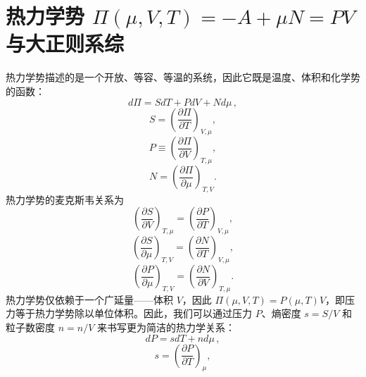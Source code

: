 \section{\texorpdfstring{热力学势 \(\Pi(\mu,V,T)=-A+\mu N=PV\) 与大正则系综}{热力学势 \textbackslash Pi(\textbackslash mu,V,T)=-A+\textbackslash mu N=PV 与大正则系综}}\label{ux70edux529bux5b66ux52bf-pimuvt-amu-npv-ux4e0eux5927ux6b63ux5219ux7cfbux7efc}
热力学势描述的是一个开放、等容、等温的系统，因此它既是温度、体积和化学势的函数：
\begin{equation}\tag{17.11.1}\label{eq:17.11.1}
d \Pi = S d T + P d V + N d \mu \, ,
\end{equation}
\begin{equation}\tag{17.11.2}\label{eq:17.11.2}
S = \left( \frac { \partial \Pi } { \partial T } \right) _ { V , \mu } ,
\end{equation}
\begin{equation}\tag{17.11.3}\label{eq:17.11.3}
P \equiv \left( \frac { \partial \Pi } { \partial V } \right) _ { T , \mu } ,
\end{equation}
\begin{equation}\tag{17.11.4}\label{eq:17.11.4}
N = \left( { \frac { \partial \Pi } { \partial \mu } } \right) _ { T , V } .
\end{equation}
热力学势的麦克斯韦关系为
\begin{equation}\tag{17.11.5}\label{eq:17.11.5}
\left( \frac { \partial S } { \partial V } \right) _ { T , \mu } = \left( \frac { \partial P } { \partial T } \right) _ { V , \mu } ,
\end{equation}
\begin{equation}\tag{17.11.6}\label{eq:17.11.6}
\left( \frac { \partial S } { \partial \mu } \right) _ { T , V } = \left( \frac { \partial N } { \partial T } \right) _ { V , \mu } ,
\end{equation}
\begin{equation}\tag{17.11.7}\label{eq:17.11.7}
\left( \frac { \partial P } { \partial \mu } \right) _ { T , V } = \left( \frac { \partial N } { \partial V } \right) _ { T , \mu } .
\end{equation}
热力学势仅依赖于一个广延量——体积 \(V\)，因此 \(\Pi(\mu,V,T)=P(\mu,T)V\)，即压力等于热力学势除以单位体积。因此，我们可以通过压力 \(P\)、熵密度 \(s=S/V\) 和粒子数密度 \(n=n/V\) 来书写更为简洁的热力学关系：
\begin{equation}\tag{17.11.8}\label{eq:17.11.8}
d P = s d T + n d \mu \, ,
\end{equation}
\begin{equation}\tag{17.11.9}\label{eq:17.11.9}
s = \left( \frac { \partial P } { \partial T } \right) _ { \mu } ,
\end{equation}
